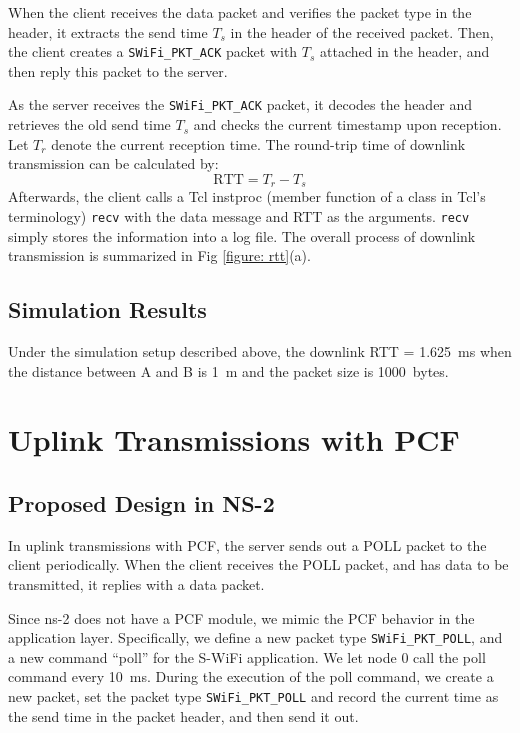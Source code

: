 \documentclass{article}
\begin{document}
When the client receives the data packet and verifies the packet type in the header, it extracts the send time $T_s$ in the header of the received packet. Then, the client creates a \lstinline|SWiFi_PKT_ACK| packet with $T_s$ attached in the header, and then reply this packet to the server.

As the server receives the \lstinline|SWiFi_PKT_ACK| packet, it decodes the header and retrieves the old send time $T_s$ and checks the current timestamp upon reception. Let $T_r$ denote the current reception time. The round-trip time of downlink transmission can be calculated by:
\begin{equation}\label{equation: rtt}
\textrm{RTT}=T_r - T_s
\end{equation}
Afterwards, the client calls a Tcl instproc (member function of a class
in Tcl's terminology) \lstinline|recv| with the data message and RTT as the
arguments. \lstinline|recv| simply stores the information into a log file.
The overall process of downlink transmission is summarized in Fig \ref{figure: rtt}(a). 

\subsection{Simulation Results}
Under the simulation setup described above, the downlink RTT = \SI{1.625}{ms} when the distance between A and B is \SI{1}{m} and the packet size is \SI{1000}{bytes}. 
\section{Uplink Transmissions with PCF}
\label{section: uplink}
\subsection{Proposed Design in NS-2}
In uplink transmissions with PCF, the server sends out a POLL packet to
the client periodically. When the client receives the POLL packet, and has data
to be transmitted, it replies with a data packet.

Since ns-2 does not have a PCF module, we mimic the PCF behavior in the
application layer. Specifically, we define a new packet type
\lstinline|SWiFi_PKT_POLL|, and a new command ``poll'' for the S-WiFi
application. We let node 0 call the poll command every \SI{10}{ms}.
During the execution of the poll command, we create a new packet, set the packet
type \lstinline|SWiFi_PKT_POLL| and record the current time as the send time in
the packet header, and then send it out.
\end{document}
